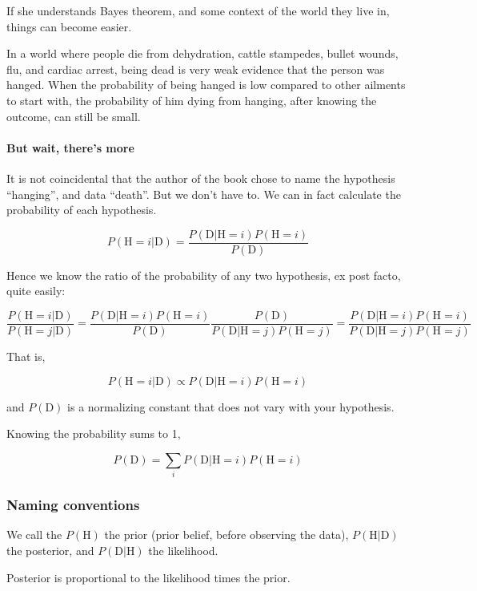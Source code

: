 \documentclass[]{article}
\let\oldparagraph\paragraph
\renewcommand{\paragraph}[1]{\oldparagraph{#1}\mbox{}}
\begin{document}
If she understands Bayes theorem, and some context of the world they
live in, things can become easier.

In a world where people die from dehydration, cattle stampedes, bullet
wounds, flu, and cardiac arrest, being dead is very weak evidence that
the person was hanged. When the probability of being hanged is low
compared to other ailments to start with, the probability of him dying
from hanging, after knowing the outcome, can still be small.

\paragraph{But wait, there's more}\label{but-wait-theres-more}

It is not coincidental that the author of the book chose to name the
hypothesis ``hanging'', and data ``death''. But we don't have to. We can
in fact calculate the probability of each hypothesis.

\[ P(\mbox{H}=i|\mbox{D}) = \frac{P(\mbox{D}|\mbox{H}=i)P(\mbox{H}=i)}{P(\mbox{D})} \]

Hence we know the ratio of the probability of any two hypothesis, ex
post facto, quite easily:

\[
\frac{P(\mbox{H}=i|\mbox{D})}{P(\mbox{H}=j|\mbox{D})} 
= \frac{P(\mbox{D}|\mbox{H}=i)P(\mbox{H}=i)}{P(\mbox{D})} \frac{P(\mbox{D})}{P(\mbox{D}|\mbox{H}=j)P(\mbox{H}=j)} 
= \frac{P(\mbox{D}|\mbox{H}=i)P(\mbox{H}=i)}{P(\mbox{D}|\mbox{H}=j)P(\mbox{H}=j)}
\]

That is,

\[
P(\mbox{H}=i|\mbox{D}) \propto P(\mbox{D}|\mbox{H}=i)P(\mbox{H}=i)
\]

and \(P(\mbox{D})\) is a normalizing constant that does not vary with
your hypothesis.

Knowing the probability sums to 1,

\[P(\mbox{D}) = \sum_i P(\mbox{D}|\mbox{H}=i)P(\mbox{H}=i)\]

\subsubsection{Naming conventions}\label{naming-conventions}

We call the \(P(\mbox{H})\) the prior (prior belief, before observing
the data), \(P(\mbox{H}|\mbox{D})\) the posterior, and
\(P(\mbox{D}|\mbox{H})\) the likelihood.

Posterior is proportional to the likelihood times the prior.
\end{document}
